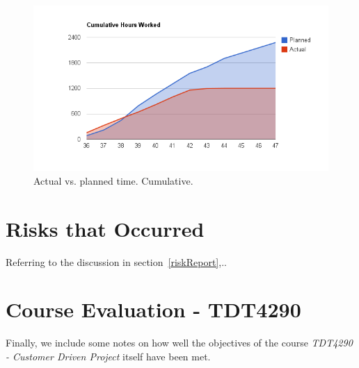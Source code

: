 \begin{centering}
  \begin{figure}
    \includegraphics[width = \textwidth]{Evaluation/actual_v_planned_cuml.png}
    \caption{Actual vs. planned time. Cumulative.}
    \label{actualPlannedCuml}
  \end{figure}
\end{centering}

\section{Risks that Occurred}

Referring to the discussion in section~\ref{riskReport},..

\section{Course Evaluation - TDT4290}

Finally, we include some notes on how well the objectives of the
course \emph{TDT4290 - Customer Driven Project} itself have been met.